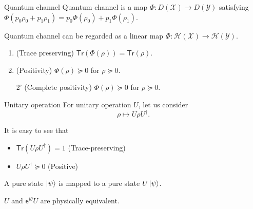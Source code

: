 \documentclass{beamer}
\newcommand{\Tr}{\mathsf{Tr}}
\newcommand\emm[1]{\textcolor{redorange}{{#1}}}
\begin{document}
\begin{frame}{Quantum channel}
Quantum channel is a map $\Phi\colon D(\mathcal{X})\to D(\mathcal{Y})$ satisfying $\Phi(p_0 \rho_0 + p_1 \rho_1) = p_0\Phi(\rho_0) + p_1\Phi(\rho_1)$.

\vspace{2em}
Quantum channel can be regarded as a \emm{linear map} $\Phi\colon\mathcal{H}(\mathcal{X})\to \mathcal{H}(\mathcal{Y})$.

\begin{enumerate}
\item (Trace preserving) $\Tr(\Phi(\rho)) = \Tr(\rho)$.
\item (Positivity) $\Phi(\rho)\succeq 0$ for $\rho\succeq 0$.
\end{enumerate}

\begin{enumerate}
\item[2'] (Complete positivity) $\Phi(\rho)\succeq 0$ for $\rho\succeq 0$.
\end{enumerate}
\end{frame}
\fi


\begin{frame}{Unitary operation}
For unitary operation $U$, let us consider
\begin{equation*}
\rho\mapsto U\rho U^\dagger.
\end{equation*}

\vspace{2em}
It is easy to see that
\begin{itemize}
\item $\Tr(U\rho U^\dagger)=1$ (Trace-preserving)
\item $U\rho U^\dagger\succeq 0$ (Positive)
\end{itemize}

\vspace{3em}
A pure state $\ket{\psi}$ is mapped to a pure state $U\ket{\psi}$.

\vspace{2em}
$U$ and $\mathsf{e}^{i\theta}U$ are physically equivalent.
\end{frame}
\end{document}
